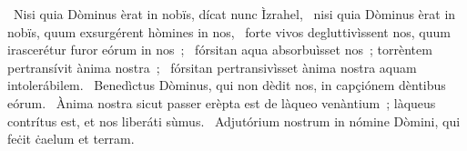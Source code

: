 ~Nisi quia Dòminus èrat in nobïs, dícat nunc Ìzrahel, 
~nisi quia Dòminus èrat in nobïs, quum exsurgérent hòmines in nos, 
~forte vivos degluttivìssent nos, quum irascerétur furor eórum in nos~; 
~fórsitan aqua absorbuìsset nos~; torrèntem pertransívit ànima nostra~; 
~fórsitan pertransivìsset ànima nostra aquam intolerábilem. 
~Benedìctus Dòminus, qui non dèdit nos, in capçiónem dèntibus eórum. 
~Ànima nostra sicut passer erèpta est de làqueo venàntium~; làqueus contrítus est, et nos liberáti sùmus. 
~Adjutórium nostrum in nómine Dòmini, qui feċit ċaelum et terram. 
